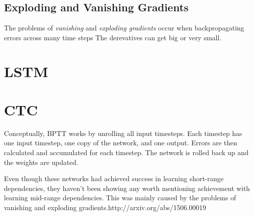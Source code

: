 \subsection{Exploding and Vanishing Gradients}

The problems of \textit{vanishing} and \textit{exploding gradients} occur when backpropagating errors across many time steps
The derevatives can get big or very small.

\section{LSTM}


\section{CTC}

Conceptually, BPTT works by unrolling all input timesteps.
Each timestep has one input timestep, one copy of the network, and one output.
Errors are then calculated and accumulated for each timestep.
The network is rolled back up and the weights are updated.


Even though these networks had achieved success in learning short-range dependencies, they haven’t been showing any worth mentioning achievement with learning mid-range dependencies.
This was mainly caused by the problems of vanishing and exploding gradients.{http://arxiv.org/abs/1506.00019}
